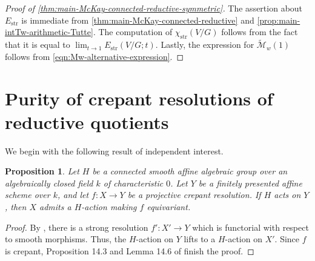 \documentclass[12pt,a4paper]{amsart}
\newtheorem{proposition}[proposition]{Proposition}
\theoremstyle{definition}
\newcommand{\cM}{\mathcal{M}}
\newcommand{\str}{\mathrm{str}}
\renewcommand{\1}{\textbf{1}}
\newcommand{\<}{\langle}
\renewcommand{\>}{\rangle}
\begin{document}
\begin{proof}[{Proof of \autoref{thm:main-McKay-connected-reductive-symmetric}}]
The assertion about $E_{\str}$ is immediate from \autoref{thm:main-McKay-connected-reductive} and \autoref{prop:main-intTw-arithmetic-Tutte}. The computation of $\chi_{\str}(V/G)$ follows from the fact that it is equal to $\lim_{t\to1}E_{\str}(V/G;t)$. Lastly, the expression for $\widetilde{\cM}_w(1)$ follows from \eqref{eqn:Mw-alternative-expression}.
\end{proof}









	
	
	
	
	
	
	
	
	
	
	
	
	
	
	
	
	
	
	
	
	
	
\section{Purity of crepant resolutions of reductive quotients}


We begin with the following result of independent interest.

\begin{proposition}\label{prop:crepant-lift-action}
Let $H$ be a connected smooth affine algebraic group over an algebraically closed field $k$ of characteristic $0$. Let $Y$ be a finitely presented affine scheme over $k$, and let $f\colon X\to Y$ be a projective crepant resolution. If $H$ acts on $Y$, then $X$ admits a $H$-action making $f$ equivariant.
\end{proposition}
\begin{proof}
By \cite[Theorem 1.1]{BierstoneMilmanTemkin2011}, there is a strong resolution $f'\colon X'\to Y$ which is functorial with respect to smooth morphisms. Thus, the $H$-action on $Y$ lifts to a $H$-action on $X'$. Since $f$ is crepant, Proposition 14.3 and Lemma 14.6 of \cite{SatrianoUsatine9} finish the proof.
\end{proof}
\end{document}
